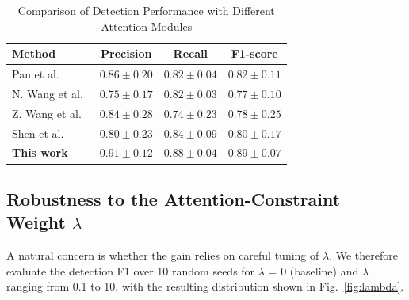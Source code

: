 \documentclass[lettersize,journal]{IEEEtran}
\begin{document}
\begin{table}[]
\caption{Comparison of Detection Performance with Different Attention Modules}
\label{tab:attention_comparison}
\centering
\setlength{\tabcolsep}{4pt}
\begin{tabular}{lccc}
\toprule
Method & Precision & Recall & F1-score \\
\midrule
Pan et al.~\cite{SE}         & $0.86 \pm 0.20$ & $0.82 \pm 0.04$ & $0.82 \pm 0.11$ \\
N. Wang et al.~\cite{CBAM}     & $0.75 \pm 0.17$ & $0.82 \pm 0.03$ & $0.77 \pm 0.10$ \\
Z. Wang et al.~\cite{Non-local}  & $0.84 \pm 0.28$ & $0.74 \pm 0.23$ & $0.78 \pm 0.25$ \\
Shen et al.~\cite{CA}    & $0.80 \pm 0.23$ & $0.84 \pm 0.09$ & $0.80 \pm 0.17$ \\
\textbf{This work} & $\mathbf{0.91 \pm 0.12}$ & $\mathbf{0.88 \pm 0.04}$ & $\mathbf{0.89 \pm 0.07}$ \\
\bottomrule
\end{tabular}
\end{table}




\subsection{Robustness to the Attention-Constraint Weight $\lambda$}
\label{lambda}
A natural concern is whether the gain relies on careful tuning of $\lambda$.
We therefore evaluate the detection F1 over 10 random seeds for $\lambda$  = 0 (baseline) and $\lambda$  ranging from 0.1 to 10, with the resulting distribution shown in Fig.~\ref{fig:lambda}.
\end{document}
